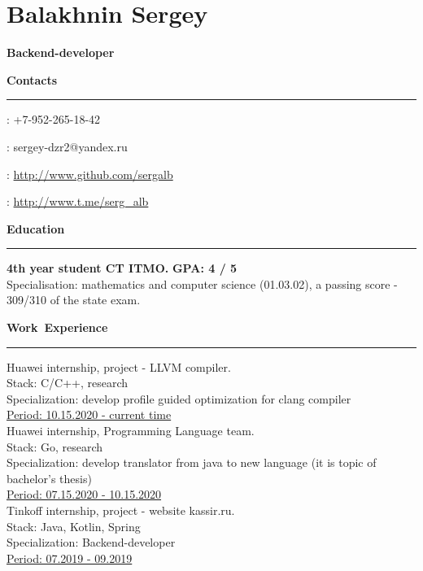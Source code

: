 \documentclass[10pt, a4paper]{report}
\author{Balakhnin Sergey}
\begin{document}
    \section*{Balakhnin Sergey}

    {\large\textbf{Backend-developer}}

    \hbox{\large\textbf{Contacts}}\kern5pt\hrule\kern5pt

    \faPhone: +7-952-265-18-42

    \Letter: sergey-dzr2@yandex.ru

    \faGithub: \url{http://www.github.com/sergalb}

    \faSend: \url{http://www.t.me/serg_alb}\\



    \par\hbox{\large\textbf{Education}}\kern5pt\hrule\kern5pt

    \textbf{4th year student CT ITMO.}
    \hfill
    \textbf{ GPA: 4 / 5} \\
        Specialisation: mathematics and computer science (01.03.02), a passing score - 309/310 of the state exam.\\

    \par\hbox{\large\textbf{Work Experience}}\kern3pt\hrule\kern10pt

    Huawei internship, project - LLVM compiler. \\
    Stack: C/C++, research \\
    Specialization: develop profile guided optimization for clang compiler\\
    \underline{Period: 10.15.2020 - current time} \\

    Huawei internship, Programming Language team. \\
    Stack: Go, research \\
    Specialization: develop translator from java to new language (it is topic of bachelor's thesis)\\
    \underline{Period: 07.15.2020 - 10.15.2020} \\

    Tinkoff internship, project - website kassir.ru. \\
    Stack: Java, Kotlin, Spring \\
    Specialization: Backend-developer \\
    \underline{Period: 07.2019 - 09.2019} \\
\end{document}
